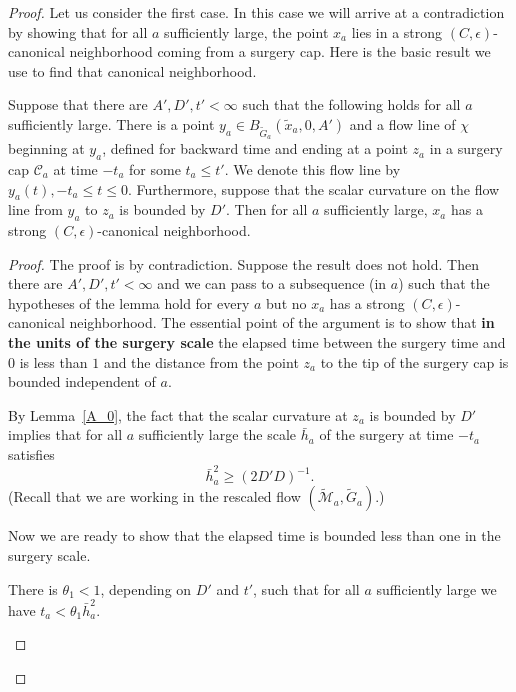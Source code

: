 \begin{proof}
Let us consider the first case. In this case we will arrive at a
contradiction by showing that for all $a$ sufficiently large, the
point $x_a$ lies in a strong $(C,\epsilon)$-canonical neighborhood
coming from a surgery cap. Here is the basic result we use to find
that canonical neighborhood.

\begin{lemma}
\label{lem:std-cap-canonical-neighborhood}\label{lemstdcan}
Suppose that there are $A',D',t'<\infty$ such that the following
holds for all $a$ sufficiently large.  There is a point $y_a\in
B_{\widetilde G_a}(\tilde x_a,0,A')$ and a  flow line of $\chi$
 beginning at $y_a$, defined for backward time and ending at a
 point $z_a$ in a
surgery cap ${\mathcal C}_a$ at time $-t_a$ for some $t_a\le t'$. We
denote this flow line by $y_a(t), -t_a\le t\le 0$. Furthermore,
suppose that the scalar curvature on  the  flow line from $y_a$ to
$z_a$ is bounded by $D'$. Then for all $a$ sufficiently large, $x_a$
has a strong $(C,\epsilon)$-canonical neighborhood.
\end{lemma}


\begin{proof}
  The proof is by contradiction. Suppose
the result does not hold. Then there are $A',D',t'<\infty $ and we
can pass to a subsequence (in $a$) such that  the hypotheses of the
lemma hold for every $a$ but no $x_a$ has a strong
$(C,\epsilon)$-canonical neighborhood. The essential point of the
argument is to show that {\bf in the units of the surgery scale} the
elapsed time between the surgery time and $0$ is less than $1$ and
the distance from the point $z_a$ to the tip of the surgery cap is
bounded independent of $a$.

 By Lemma~\ref{A_0}, the fact
that the scalar curvature at $z_a$ is bounded by $D'$ implies that
for all $a$ sufficiently large the scale $\bar h_a$ of the surgery
at time $-t_a$ satisfies
\begin{equation}\label{hequat}
\bar h_a^2\ge (2D'D)^{-1}.
\end{equation}
(Recall that we are working in the rescaled flow $(\widetilde {\mathcal M}_a,\widetilde G_a)$.)



Now we are ready to show that the elapsed time is bounded less than
one in the surgery scale.

\begin{claim}
\label{claim:elapsed-time-bounded-by-theta1}
There is $\theta_1<1$, depending on $D'$ and $t'$, such that for all
$a$ sufficiently large we have  $t_a< \theta_1\bar h_a^2$.
\end{claim}


\end{proof}
\end{proof}
